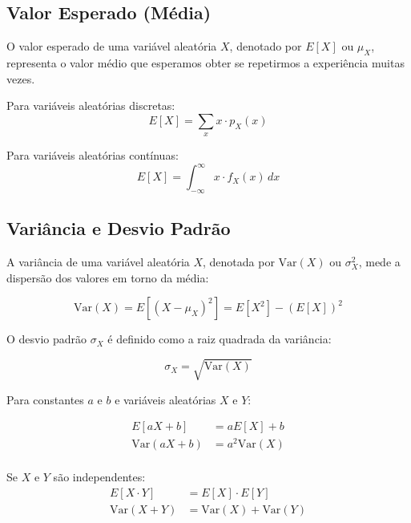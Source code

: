 \documentclass[a4paper,12pt]{article}
\begin{document}
\subsection{Valor Esperado (Média)}

O valor esperado de uma variável aleatória $X$, denotado por $E[X]$ ou $\mu_X$, representa o valor médio que esperamos obter se repetirmos a experiência muitas vezes.

Para variáveis aleatórias discretas:
\begin{equation}
E[X] = \sum_{x} x \cdot p_X(x)
\end{equation}

Para variáveis aleatórias contínuas:
\begin{equation}
E[X] = \int_{-\infty}^{\infty} x \cdot f_X(x) \, dx
\end{equation}

\subsection{Variância e Desvio Padrão}

A variância de uma variável aleatória $X$, denotada por $\text{Var}(X)$ ou $\sigma_X^2$, mede a dispersão dos valores em torno da média:

\begin{equation}
\text{Var}(X) = E[(X - \mu_X)^2] = E[X^2] - (E[X])^2
\end{equation}

O desvio padrão $\sigma_X$ é definido como a raiz quadrada da variância:

\begin{equation}
\sigma_X = \sqrt{\text{Var}(X)}
\end{equation}

\begin{tcolorbox}[colback=blue!5, colframe=blue!40, title=\textbf{Propriedades do Valor Esperado e Variância}]
Para constantes $a$ e $b$ e variáveis aleatórias $X$ e $Y$:

\begin{align}
E[aX + b] &= aE[X] + b \\
\text{Var}(aX + b) &= a^2\text{Var}(X) \\
\end{align}

Se $X$ e $Y$ são independentes:
\begin{align}
E[X \cdot Y] &= E[X] \cdot E[Y] \\
\text{Var}(X + Y) &= \text{Var}(X) + \text{Var}(Y)
\end{align}
\end{tcolorbox}
\end{document}
